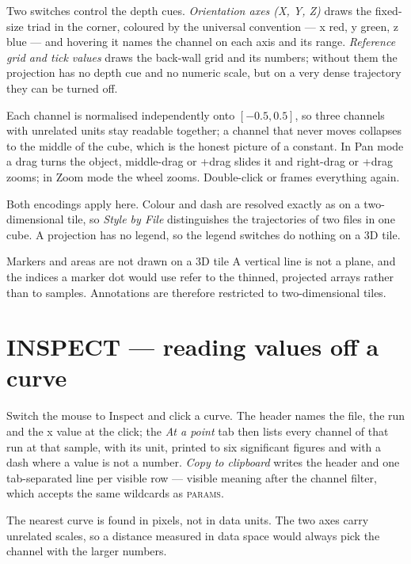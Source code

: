 \documentclass[11pt,a4paper,oneside]{report}
\newcommand{\key}[1]{\textsf{\small\fbox{#1}}}
\newcommand{\tab}[1]{\textsc{#1}}
\begin{document}
Two switches control the depth cues. \emph{Orientation axes (X, Y, Z)} draws the
fixed-size triad in the corner, coloured by the universal convention --- x red, y
green, z blue --- and hovering it names the channel on each axis and its range.
\emph{Reference grid and tick values} draws the back-wall grid and its numbers;
without them the projection has no depth cue and no numeric scale, but on a very
dense trajectory they can be turned off.

Each channel is normalised independently onto $[-0.5, 0.5]$, so three channels
with unrelated units stay readable together; a channel that never moves collapses
to the middle of the cube, which is the honest picture of a constant. In Pan mode
a drag turns the object, middle-drag or \key{Shift}+drag slides it and
right-drag or \key{Ctrl}+drag zooms; in Zoom mode the wheel zooms. Double-click
or \key{Ctrl+0} frames everything again.

Both encodings apply here. Colour and dash are resolved exactly as on a
two-dimensional tile, so \emph{Style by File} distinguishes the trajectories of
two files in one cube. A projection has no legend, so the legend switches do
nothing on a 3D tile.

\begin{aoelimit}{Markers and areas are not drawn on a 3D tile}
A vertical line is not a plane, and the indices a marker dot would use refer to
the thinned, projected arrays rather than to samples. Annotations are therefore
restricted to two-dimensional tiles.
\end{aoelimit}

\section{INSPECT --- reading values off a curve}

Switch the mouse to Inspect and click a curve. The header names the file, the run
and the x value at the click; the \emph{At a point} tab then lists every channel
of that run at that sample, with its unit, printed to six significant figures and
with a dash where a value is not a number. \emph{Copy to clipboard} writes the
header and one tab-separated line per visible row --- visible meaning after the
channel filter, which accepts the same wildcards as \tab{params}.

The nearest curve is found in pixels, not in data units. The two axes carry
unrelated scales, so a distance measured in data space would always pick the
channel with the larger numbers.
\end{document}
